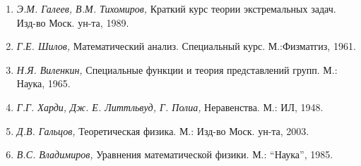 \documentclass[a4paper
]{article}
\begin{document}
\begin{enumerate}
{\it Б.А. Дубровин, С.П. Новиков, А.Т. Фоменко,} Современная
геометрия: методы и приложения. М.:УРСС, 1998. \item {\it Э.М.
Галеев, В.М. Тихомиров,} Краткий курс теории экстремальных задач.
Изд-во Моск. ун-та, 1989. \item {\it Г.Е. Шилов,} Математический
анализ. Специальный курс. М.:Физматгиз, 1961. \item {\it  Н.Я.
Виленкин,} Специальные функции и теория представлений групп. М.:
Наука, 1965. \item {\it Г.Г. Харди, Дж. Е. Литтльвуд, Г. Полиа,}
Неравенства. М.: ИЛ, 1948.
\item {\it Д.В. Гальцов,} Теоретическая физика. М.: Изд-во Моск.
ун-та, 2003.
\item {\it В.С. Владимиров,} Уравнения математической физики. М.:
``Наука'', 1985.
\end{enumerate}
\end{document}
